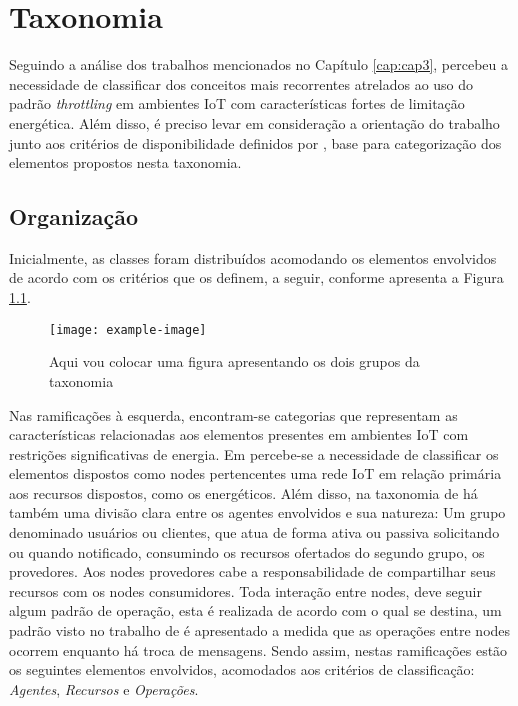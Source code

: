\chapter{Taxonomia}
\label{cap:cap4}

Seguindo a análise dos trabalhos mencionados no Capítulo \ref{cap:cap3}, percebeu a necessidade de classificar dos conceitos mais recorrentes atrelados ao uso do padrão \textit{throttling} em ambientes IoT com características fortes de limitação energética. Além disso, é preciso levar em consideração a orientação do trabalho junto aos critérios de disponibilidade definidos por \cite{avizienis_basic_2004}, base para categorização dos elementos propostos nesta taxonomia. 

\section{Organização}

Inicialmente, as classes foram distribuídos acomodando os elementos envolvidos de acordo com os critérios que os definem, a seguir, conforme apresenta a Figura \ref{fig:taxonomia_geral}.


\begin{figure}[h]
\noindent\texttt{[image: example-image]} 
\caption{Aqui vou colocar uma figura apresentando os dois grupos da taxonomia}
\label{fig:taxonomia_geral}
\centering
\end{figure}

Nas ramificações à esquerda, encontram-se categorias que representam as características relacionadas aos elementos presentes em ambientes IoT com restrições significativas de energia. Em \cite{kansal_power_2007}  percebe-se a necessidade de classificar os elementos dispostos como nodes pertencentes uma rede IoT em relação primária aos recursos dispostos, como os energéticos. Além disso, na taxonomia de \cite{avizienis_basic_2004} há também uma divisão clara entre os agentes envolvidos e sua natureza: Um grupo denominado usuários ou clientes, que atua de forma ativa ou passiva solicitando ou quando notificado, consumindo os recursos ofertados do segundo grupo, os provedores. Aos nodes provedores cabe a responsabilidade de compartilhar seus recursos com os nodes consumidores. Toda interação entre nodes, deve seguir algum padrão de operação, esta é realizada de acordo com o qual se destina, um padrão visto no trabalho de \cite{khairnar_discrete-rate_2015} é apresentado a medida que as operações entre nodes ocorrem enquanto há troca de mensagens. Sendo assim, nestas ramificações estão os seguintes elementos envolvidos, acomodados aos critérios de classificação: \textit{Agentes}, \textit{Recursos} e \textit{Operações}.


